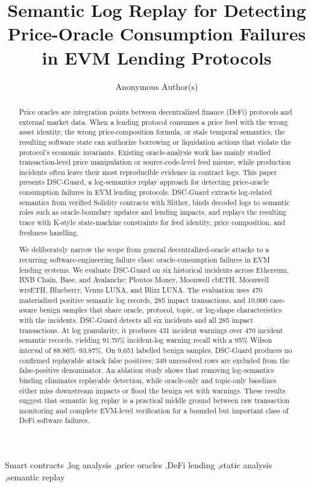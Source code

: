 \documentclass[final,5p]{elsarticle}
\newcommand{\tool}{DSC-Guard\xspace}
\begin{document}
\begin{frontmatter}

\title{Semantic Log Replay for Detecting Price-Oracle Consumption Failures in EVM Lending Protocols}

\author[inst1]{Anonymous Author(s)}
\address[inst1]{Anonymous Institution}

\begin{abstract}
Price oracles are integration points between decentralized finance (DeFi) protocols and external market data.
When a lending protocol consumes a price feed with the wrong asset identity, the wrong price-composition formula, or stale temporal semantics, the resulting software state can authorize borrowing or liquidation actions that violate the protocol's economic invariants.
Existing oracle-analysis work has mainly studied transaction-level price manipulation or source-code-level feed misuse, while production incidents often leave their most reproducible evidence in contract logs.
This paper presents \tool, a log-semantics replay approach for detecting price-oracle consumption failures in EVM lending protocols.
\tool extracts log-related semantics from verified Solidity contracts with Slither, binds decoded logs to semantic roles such as oracle-boundary updates and lending impacts, and replays the resulting trace with K-style state-machine constraints for feed identity, price composition, and freshness handling.

We deliberately narrow the scope from general decentralized-oracle attacks to a recurring software-engineering failure class: oracle-consumption failures in EVM lending systems.
We evaluate \tool on six historical incidents across Ethereum, BNB Chain, Base, and Avalanche: Ploutos Money, Moonwell cbETH, Moonwell wrsETH, Blueberry, Venus LUNA, and Blizz LUNA.
The evaluation uses 470 materialized positive semantic log records, 285 impact transactions, and 10,000 case-aware benign samples that share oracle, protocol, topic, or log-shape characteristics with the incidents.
\tool detects all six incidents and all 285 impact transactions.
At log granularity, it produces 431 incident warnings over 470 incident semantic records, yielding 91.70\% incident-log warning recall with a 95\% Wilson interval of 88.86\%--93.87\%.
On 9,651 labelled benign samples, \tool produces no confirmed replayable attack false positives; 349 unresolved rows are excluded from the false-positive denominator.
An ablation study shows that removing log-semantics binding eliminates replayable detection, while oracle-only and topic-only baselines either miss downstream impacts or flood the benign set with warnings.
These results suggest that semantic log replay is a practical middle ground between raw transaction monitoring and complete EVM-level verification for a bounded but important class of DeFi software failures.
\end{abstract}

\begin{keyword}
Smart contracts \sep log analysis \sep price oracles \sep DeFi lending \sep static analysis \sep semantic replay
\end{keyword}

\end{frontmatter}
\end{document}

